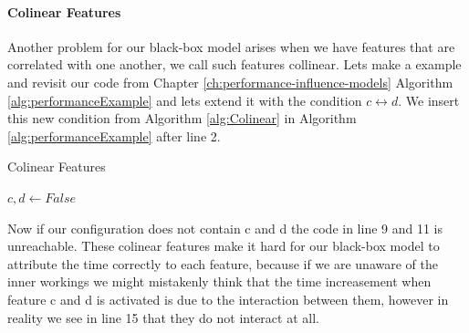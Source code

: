 \paragraph{Colinear Features}
Another problem for our black-box model arises when we have features that are correlated with one another, we call such features collinear.
Lets make a example and revisit our code from Chapter \ref{ch:performance-influence-models} Algorithm \ref{alg:performanceExample} and lets extend
it with the condition $c \leftrightarrow d$. We insert this new condition from Algorithm \ref{alg:Colinear} in Algorithm 
\ref{alg:performanceExample} after line 2.

\begin{algorithm}
    \caption{Colinear Features \label{alg:Colinear}}
    \begin{algorithmic}[1]

        \State $c,d \gets False$
    \EndIf

    \end{algorithmic}
    \end{algorithm}

Now if our configuration does not contain c and d the code in line 9 and 11 is unreachable. These colinear features make it hard for our
black-box model to attribute the time correctly to each feature, because if we are unaware of the inner workings we might mistakenly think
that the time increasement when feature c and d is activated is due to the interaction between them, however in reality we see in line
15 that they do not interact at all.